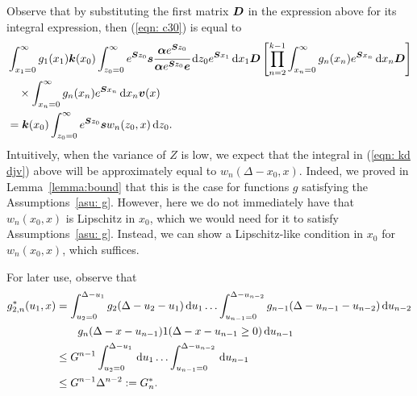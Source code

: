 	Observe that by substituting the first matrix \(\boldsymbol D\) in the expression above for its integral expression, then (\ref{eqn: c30}) is equal to 
	\begin{align}
		&\int_{x_1=0}^\infty g_1(x_1) \boldsymbol k(x_0) \int_{z_0=0}^\infty e^{\boldsymbol Sz_0}\boldsymbol s\cfrac{\boldsymbol\alpha e^{\boldsymbol Sz_0}}{\boldsymbol\alpha e^{\boldsymbol Sz_0}\boldsymbol e} \, \mathrm{d} z_0 e^{\boldsymbol{S}x_1}\, \mathrm{d} x_1\boldsymbol D 
            	\left[\prod_{n=2}^{k-1}\int_{x_n=0}^\infty g_n(x_n) e^{\boldsymbol{S}x_n} \, \mathrm{d} x_n
		\boldsymbol D\right]
            	\\\nonumber&\quad\times\int_{x_n=0}^\infty g_{n}(x_n) e^{\boldsymbol{S}x_n} \, \mathrm{d} x_n {\boldsymbol v}(x) 
		\\&=\boldsymbol k(x_0) \int_{z_0=0}^\infty e^{\boldsymbol Sz_0}\boldsymbol sw_n(z_0,x)\, \mathrm{d} z_0.\label{eqn: kd djv}
	\end{align}
	Intuitively, when the variance of \(Z\) is low, we expect that the integral in (\ref{eqn: kd djv}) above will be approximately equal to \(w_n(\Delta-x_0,x)\). Indeed, we proved in Lemma~\ref{lemma:bound} that this is the case for functions \(g\) satisfying the Assumptions~\ref{asu: g}. However, here we do not immediately have that \(w_n(x_0,x)\) is Lipschitz in \(x_0\), which we would need for it to satisfy Assumptions~\ref{asu: g}. Instead, we can show a Lipschitz-like condition in \(x_0\) for \(w_n(x_0,x)\), which suffices. 
	
For later use, observe that 
\begin{align}
	g^*_{2,n}(u_1,x) &= \int_{u_2=0}^{\Delta-u_1}g_2(\Delta - u_2 - u_1)\, \mathrm{d} u_1 \dots \nonumber 
         	\int_{u_{n-1}=0}^{\Delta-u_{n-2}} g_{n-1}(\Delta - u_{n-1} - u_{n-2}) \, \mathrm{d} u_{n-2}
       	\\&\qquad{}g_{n}(\Delta - x-u_{n-1})1(\Delta-x-u_{n-1}\geq0)\, \mathrm{d} u_{n-1} \nonumber
 	\\&\leq G^{n-1}\int_{u_2=0}^{\Delta-u_1}\, \mathrm{d} u_1 \dots\nonumber
            	\int_{u_{n-1}=0}^{\Delta-u_{n-2}}  \, \mathrm{d} u_{n-1}
		\\&\leq G^{n-1}\Delta^{n-2}:=G^*_n.
\end{align}

